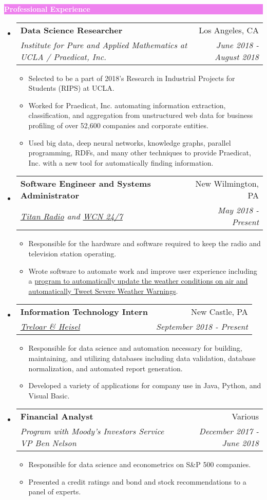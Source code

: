 \documentclass[letterpaper,11pt]{article}
\makeatletter
\newcommand{\resitem}[1]{\item #1 \vspace{-2pt}}
\newcommand{\resheading}[1]{{\large \colorbox{violet}{\begin{minipage}{\textwidth}{\textbf{#1 \vphantom{p\^{E}}}}\end{minipage}}}}
\newcommand{\ressubheading}[4]{
	\begin{tabular*}{7.0in}{l@{\extracolsep{\fill}}r}
		\textbf{#1} & #2 \\
		\textit{#3} & \textit{#4} \\
	\end{tabular*}\vspace{-6pt}}
\makeatother
\begin{document}
	\resheading{\textcolor{white}{Professional Experience}}
	\begin{itemize}
		\item
		\ressubheading{Data Science Researcher}{Los Angeles, CA}{Institute for Pure and Applied Mathematics at UCLA / Praedicat, Inc.}{June 2018 -August 2018}
		\begin{itemize}
			\resitem{Selected to be a part of 2018’s Research in Industrial Projects for Students (RIPS) at UCLA.}
			\resitem{Worked for Praedicat, Inc. automating information extraction, classification, and aggregation from unstructured web data for business profiling of over 52,600 companies and corporate entities.}
			\resitem{Used big data, deep neural networks, knowledge graphs, parallel programming, RDFs, and many other techniques to provide Praedicat, Inc. with a new tool for automatically finding information.}
		\end{itemize}
		\item
		\ressubheading{Software Engineer and Systems Administrator}{New Wilmington, PA}{\href{http://titanradio.net/}{Titan Radio} and \href{https://www.wcn247.com/}{WCN 24/7}}{May 2018 - Present}
		\begin{itemize}
			\resitem{Responsible for the hardware and software required to keep the radio and television station operating.}
			\resitem{Wrote software to automate work and improve user experience including a \href{https://github.com/alexandermichels/WeatherWaves}{program to automatically update the weather conditions on air and automatically Tweet Severe Weather Warnings}.}
		\end{itemize}
		\item
		\ressubheading{Information Technology Intern}{New Castle, PA}{\href{http://treloaronline.com/}{Treloar \& Heisel}}{September 2018 - Present}
		\begin{itemize}
			\resitem{Responsible for data science and automation necessary for building, maintaining, and utilizing databases including data validation, database normalization, and  automated report generation.}
			\resitem{Developed a variety of applications for company use in Java, Python, and Visual Basic.}
		\end{itemize}
		\item
		\ressubheading{Financial Analyst}{Various}{Program with Moody’s Investors Service VP Ben Nelson}{December 2017 - June 2018}
		\begin{itemize}
			\resitem{Responsible for data science and econometrics on S\&P 500 companies.}
			\resitem{Presented a credit ratings and bond and stock recommendations to a panel of experts.}

\end{itemize}
\end{itemize}
\end{document}
